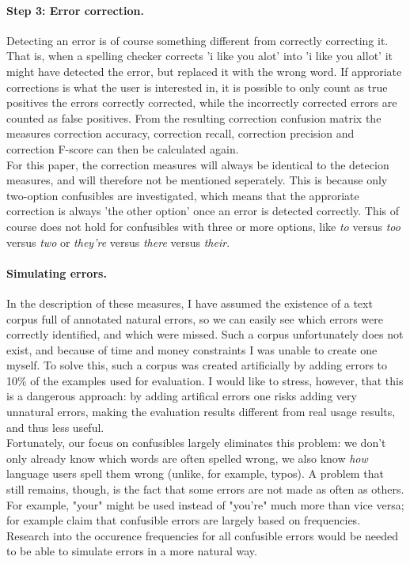 \documentclass[12pt]{article}
\begin{document}
\paragraph{Step 3: Error correction.} Detecting an error is of course something different from correctly correcting it. That is, when a spelling checker corrects 'i like you alot' into 'i like you allot' it might have detected the error, but replaced it with the wrong word. If approriate corrections is what the user is interested in, it is possible to only count as true positives the errors correctly corrected, while the incorrectly corrected errors are counted as false positives. From the resulting correction confusion matrix the measures correction accuracy, correction recall, correction precision and correction F-score can then be calculated again. \\\indent
For this paper, the correction measures will always be identical to the detecion measures, and will therefore not be mentioned seperately. This is because only two-option confusibles are investigated, which means that the approriate correction is always 'the other option' once an error is detected correctly. This of course does not hold for confusibles with three or more options, like \emph{to} versus \emph{too} versus \emph{two} or \emph{they're} versus \emph{there} versus \emph{their}.

\paragraph{Simulating errors.} In the description of these measures, I have assumed the existence of a text corpus full of annotated natural errors, so we can easily see which errors were correctly identified, and which were missed. Such a corpus unfortunately does not exist, and because of time and money constraints I was unable to create one myself. To solve this, such a corpus was created artificially by adding errors to 10\% of the examples used for evaluation. I would like to stress, however, that this is a dangerous approach: by adding artifical errors one risks adding very unnatural errors, making the evaluation results different from real usage results, and thus less useful. \\\indent
Fortunately, our focus on confusibles largely eliminates this problem: we don't only already know which words are often spelled wrong, we also know \emph{how} language users spell them wrong (unlike, for example, typos). A problem that still remains, though, is the fact that some errors are not made as often as others. For example, "your" might be used instead of "you're" much more than vice versa; \citet{sfd99} for example claim that confusible errors are largely based on frequencies. Research into the occurence frequencies for all confusible errors would be needed to be able to simulate errors in a more natural way.
\end{document}

